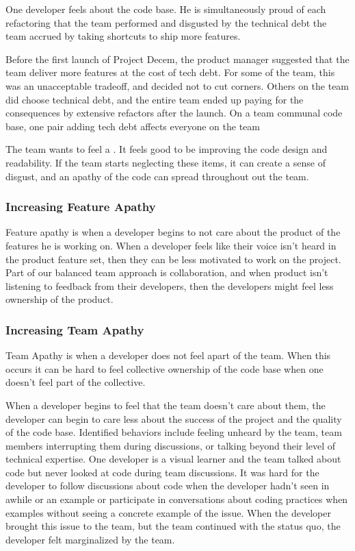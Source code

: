 One developer feels  about the code base. He is simultaneously proud of each refactoring that the team performed and disgusted by the technical debt the team accrued by taking shortcuts to ship more features. 

Before the first launch of Project Decem, the product manager suggested that the team deliver more features at the cost of tech debt. For some of the team, this was an unacceptable tradeoff, and decided not to cut corners. Others on the team did choose technical debt, and the entire team ended up paying for the consequences by extensive refactors after the launch. On a team communal code base, one pair adding tech debt affects everyone on the team

The team wants to feel a .  It feels good to be improving the code design and readability. If the team starts neglecting these items, it can create a sense of disgust, and an apathy of the code can spread throughout out the team.

\subsubsection{Increasing Feature Apathy}
Feature apathy is when a developer begins to not care about the product of the features he is working on. When a developer feels like their voice isn't heard in the product feature set, then they can be less motivated to work on the project. Part of our balanced team approach is collaboration, and when product isn't listening to feedback from their developers, then the developers might feel less ownership of the product.

\subsubsection{Increasing Team Apathy}
Team Apathy is when a developer does not feel apart of the team. When this occurs it can be hard to feel collective ownership of the code base when one doesn't feel part of the collective.

When a developer begins to feel that the team doesn't care about them, the developer can begin to care less about the success of the project and the quality of the code base. Identified behaviors include feeling unheard by the team, team members interrupting them during discussions, or talking beyond their level of technical expertise. One developer is a visual learner and the team talked about code but never looked at code during team discussions. It was hard for the developer to follow discussions about code when the developer hadn't seen in awhile or an example or participate in conversations about coding practices when examples without seeing a concrete example of the issue. When the developer brought this issue to the team, but the team continued with the status quo, the developer felt marginalized by the team.

